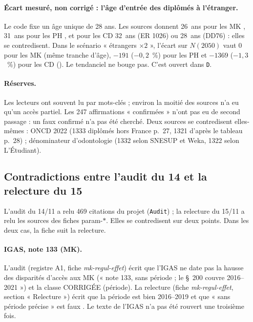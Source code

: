 \paragraph{Écart mesuré, non corrigé : l'âge d'entrée des diplômés à l'étranger.} Le code fixe un âge unique de
28\suppose{} ans. Les sources donnent 26~ans\mesure{} pour les MK \citep{d-er1075}, 31~ans\mesure{} pour les PH
\citep{d-dd76}, et pour les CD 32~ans\mesure{} (ER 1026) ou 28~ans\mesure{} (DD76) : elles se contredisent.
Dans le scénario « étrangers $\times 2$ », l'écart sur $N(2050)$ vaut 0\mesure{} pour les MK (même tranche
d'âge), $-191$\mesure{} ($-0{,}2$~\%\derive) pour les PH et $\num{-1369}$\mesure{} ($-1{,}3$~\%\derive) pour les
CD (). Le tendanciel ne bouge pas. C'est ouvert dans \texttt{D}.

\paragraph{Réserves.} Les lecteurs ont souvent lu par mots-clés ; environ la moitié\mesure{} des sources n'a eu
qu'un accès partiel. Les 247 affirmations « confirmées » n'ont pas eu de second passage : un faux confirmé n'a
pas été cherché. Deux sources se contredisent elles-mêmes : ONCD 2022 (\num{1333}\mesure{} diplômés hors France
p.~27, \num{1321}\mesure{} d'après le tableau p.~28) ; dénominateur d'odontologie (\num{1332}\mesure{} selon
SNESUP et Weka, \num{1322}\mesure{} selon L'Étudiant).

\subsection{Contradictions entre l'audit du 14 et la relecture du 15}\label{par:contradictions}

L'audit du 14/11 a relu 469\mesure{} citations du projet (\texttt{Audit}) ; la relecture du 15/11 a relu les
sources des fiches param-$\ast$. Elles se contredisent sur deux points. Dans les deux cas, la fiche suit la
relecture.

\paragraph{IGAS, note 133 (MK).} L'audit (registre A1, fiche \emph{mk-regul-effet}) écrit que l'IGAS ne
date pas la hausse des disparités d'accès aux MK (« note 133, sans période ; le \S~200 couvre 2016--2021 ») et
la classe CORRIGÉE (période). La relecture (fiche \emph{mk-regul-effet}, section « Relecture ») écrit que la
période est bien 2016--2019 et que « sans période précise » est faux \citep{d-igas2023}. Le texte de l'IGAS n'a
pas été rouvert une troisième fois.

